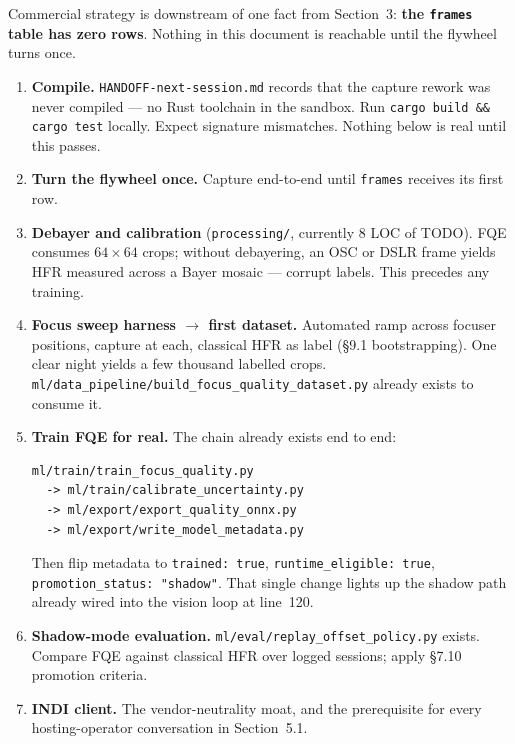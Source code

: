 \documentclass[11pt]{article}
\begin{document}
Commercial strategy is downstream of one fact from Section~3: \textbf{the
\texttt{frames} table has zero rows}. Nothing in this document is reachable
until the flywheel turns once.

\begin{enumerate}[leftmargin=1.6em,itemsep=4pt]
  \item \textbf{Compile.} \texttt{HANDOFF-next-session.md} records that the
        capture rework was never compiled --- no Rust toolchain in the sandbox.
        Run \texttt{cargo build \&\& cargo test} locally. Expect signature
        mismatches. Nothing below is real until this passes.

  \item \textbf{Turn the flywheel once.} Capture end-to-end until
        \texttt{frames} receives its first row.

  \item \textbf{Debayer and calibration} (\texttt{processing/}, currently 8 LOC
        of TODO). FQE consumes $64\times64$ crops; without debayering, an OSC or
        DSLR frame yields HFR measured across a Bayer mosaic --- corrupt labels.
        This precedes any training.

  \item \textbf{Focus sweep harness $\rightarrow$ first dataset.} Automated ramp
        across focuser positions, capture at each, classical HFR as label
        (§9.1 bootstrapping). One clear night yields a few thousand labelled
        crops. \texttt{ml/data\_pipeline/build\_focus\_quality\_dataset.py}
        already exists to consume it.

  \item \textbf{Train FQE for real.} The chain already exists end to end:

\begin{lstlisting}
ml/train/train_focus_quality.py
  -> ml/train/calibrate_uncertainty.py
  -> ml/export/export_quality_onnx.py
  -> ml/export/write_model_metadata.py
\end{lstlisting}

        Then flip metadata to \texttt{trained: true},
        \texttt{runtime\_eligible: true}, \texttt{promotion\_status:
        "shadow"}. That single change lights up the shadow path already
        wired into the vision loop at line~120.

  \item \textbf{Shadow-mode evaluation.} \texttt{ml/eval/replay\_offset\_policy.py}
        exists. Compare FQE against classical HFR over logged sessions; apply
        §7.10 promotion criteria.

  \item \textbf{INDI client.} The vendor-neutrality moat, and the prerequisite
        for every hosting-operator conversation in Section~5.1.
\end{enumerate}
\end{document}
